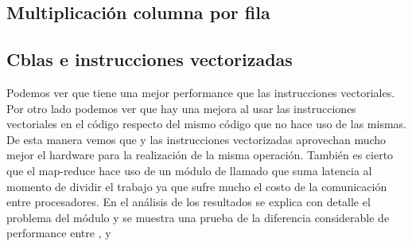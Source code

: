 \subsection{Multiplicación columna por fila}

    \def\model{ColumnByRow}
    \def\analisisAmdahl{
    Podemos observar que el speed up teórico tiende al máximo speed-up
    mientras que el real nos muestra que no usa toda la paralelizacion ya que al
    pasar de 1 a 2 threads, el tiempo no cae a la mitad, y al pasar de 1 a 4 threads
    tampoco. Se puede ver que tiene un speed-up de casi 2 lo cual quiere decir que
    hace uso de la mitad.
    }
    \def\analisisGustafson{
    Podemos ver que estos resultados demuestran que la sección serie del
    problema se mantiene casi constante respecto de la sección paralela
    que varía en forma ascendente con el tamaño de los datos de entrada.
    Pero además podemos observar que hay mucha ineficiencia respecto del uso de
    la paralelización ya que al aumentar el trabajo en casi el doble usando
    dos procesadores debería tardar aproximadamente lo mismo. Sin embargo vemos
    que el tiempo paralelo se duplicó, lo cual muestra que hay un problema de
    comunicación al aumentar el paralelismo. Mas adelante explicaremos que el
    módulo Pool es ineficiente respecto del uso de recursos
    }
    
    \newpage
    \clearpage

\subsection{Cblas e instrucciones vectorizadas}
    \def\text{Tiempo serie de multiplicación en segundos}
    \def\path{dgemm.png}
    \def\scale{.6}
    

    Podemos ver que  tiene una mejor performance que las instrucciones
    vectoriales. Por otro lado podemos ver que hay una mejora al usar las
    instrucciones vectoriales en el código  respecto del
    mismo código que no hace uso de las mismas.
    De esta manera vemos que  y las instrucciones vectorizadas
    aprovechan mucho mejor el hardware para la realización de la misma operación.
    También es cierto que el map-reduce hace uso de un módulo de 
    llamado  que suma latencia al momento de dividir el trabajo ya
    que sufre mucho el costo de la comunicación entre procesadores. En el análisis
    de los resultados se explica con detalle el problema del módulo 
    y se muestra una prueba de la diferencia considerable de performance entre
    ,  y 
